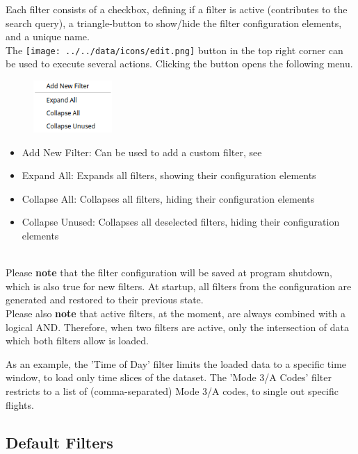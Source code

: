 Each filter consists of a checkbox, defining if a filter is active (contributes to the search query), a triangle-button to show/hide the filter configuration elements, and a unique name. \\

The \texttt{[image: ../../data/icons/edit.png]} button in the top right corner can be used to execute several actions.
Clicking the button opens the following menu.

\begin{figure}[H]
    \center
    \includegraphics[width=3cm,frame]{figures/filter_config.png}
\end{figure}

\begin{itemize}
  \item Add New Filter: Can be used to add a custom filter, see 
  \item Expand All: Expands all filters, showing their configuration elements
  \item Collapse All: Collapses all filters, hiding their configuration elements
  \item Collapse Unused: Collapses all deselected filters, hiding their configuration elements
 \end{itemize} 
 \  \\

Please \textbf{note} that the filter configuration will be saved at program shutdown, which is also true for new filters. At startup, all filters from the configuration are generated and restored to their previous state. \\

Please also \textbf{note} that active filters, at the moment, are always combined with a logical AND. Therefore, when two filters are active, only the intersection of data which both filters allow is loaded.

As an example, the 'Time of Day' filter limits the loaded data to a specific time window, to load only time slices of the dataset. 
The 'Mode 3/A Codes' filter restricts to a list of (comma-separated) Mode 3/A codes, to single out specific flights. \\

\subsection{Default Filters}
\label{sec:default_filters}

